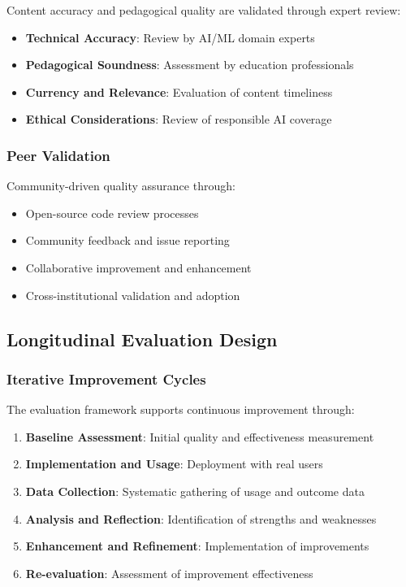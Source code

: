 Content accuracy and pedagogical quality are validated through expert review:

\begin{itemize}
    \item \textbf{Technical Accuracy}: Review by AI/ML domain experts
    \item \textbf{Pedagogical Soundness}: Assessment by education professionals
    \item \textbf{Currency and Relevance}: Evaluation of content timeliness
    \item \textbf{Ethical Considerations}: Review of responsible AI coverage
\end{itemize}

\subsubsection{Peer Validation}

Community-driven quality assurance through:

\begin{itemize}
    \item Open-source code review processes
    \item Community feedback and issue reporting
    \item Collaborative improvement and enhancement
    \item Cross-institutional validation and adoption
\end{itemize}

\subsection{Longitudinal Evaluation Design}

\subsubsection{Iterative Improvement Cycles}

The evaluation framework supports continuous improvement through:

\begin{enumerate}
    \item \textbf{Baseline Assessment}: Initial quality and effectiveness measurement
    \item \textbf{Implementation and Usage}: Deployment with real users
    \item \textbf{Data Collection}: Systematic gathering of usage and outcome data
    \item \textbf{Analysis and Reflection}: Identification of strengths and weaknesses
    \item \textbf{Enhancement and Refinement}: Implementation of improvements
    \item \textbf{Re-evaluation}: Assessment of improvement effectiveness
\end{enumerate}

